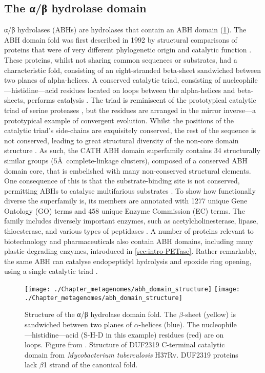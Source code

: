 \subsection{The α/β hydrolase domain}

\label{sec:intro-abh}

α/β hydrolases (ABHs) are hydrolases that contain an ABH domain (\ref{fig:abh_domain_structure}). The ABH domain fold was first described in 1992 by structural comparisons of proteins that were of very different phylogenetic origin and catalytic function \cite{Ollis1992}. These proteins, whilst not sharing common sequences or substrates, had a characteristic fold, consisting of an eight-stranded beta-sheet sandwiched between two planes of alpha-helices. A conserved catalytic triad, consisting of nucleophile---histidine---acid residues located on loops between the alpha-helices and beta-sheets, performs catalysis \cite{Ollis1992}. The triad is reminiscent of the prototypical catalytic triad of serine proteases \cite{Matthews1967}, but the residues are arranged in the mirror inverse---a prototypical example of convergent evolution. Whilst the positions of the catalytic triad's side-chains are exquisitely conserved, the rest of the sequence is not conserved, leading to great structural diversity of the non-core domain structure \cite{Dessailly2010}. As such, the CATH ABH domain superfamily contains 34 structurally similar groups ($5$\AA\ complete-linkage clusters), composed of a conserved ABH domain core, that is embelished with many non-conserved structural elements. One consequence of this is that the substrate-binding site is not conserved, permitting ABHs to catalyse multifarious substrates \cite{Suplatov2012,Mindrebo2016}. To show how functionally diverse the superfamily is, its members are annotated with \num{1277} unique Gene Ontology (GO) terms and $458$ unique Enzyme Commission (EC) terms. The family includes diversely important enzymes, such as acetylcholinesterase, lipase, thioesterase, and various types of peptidases \cite{Holmquist2005}. A number of proteins relevant to biotechnology and pharmaceuticals also contain ABH domains, including many plastic-degrading enzymes, introduced in \ref{sec:intro-PETase}. Rather remarkably, the same ABH can catalyse endopeptidyl hydrolysis and epoxide ring opening, using a single catalytic triad \cite{Zheng2016}.

\begin{figure}[!hbt]
    \centering
    \ifredact
        \texttt{[image: ./Chapter\_metagenomes/abh\_domain\_structure]}
    \else
        \texttt{[image: ./Chapter\_metagenomes/abh\_domain\_structure]}
    \fi
    \caption{%
        Structure of the α/β hydrolase domain fold.
        The $\beta$-sheet (yellow) is sandwiched between two planes of $\alpha$-helices (blue).
        The nucleophile—histidine—acid (S-H-D in this example) residues (red) are on loops.
        Figure from \cite{Lazniewski2011}.
        Structure of DUF2319 C-terminal catalytic domain from \emph{Mycobacterium tuberculosis} H37Rv.
        DUF2319 proteins lack $\beta$1 strand of the canonical fold.
    }
    \label{fig:abh_domain_structure}
\end{figure}

